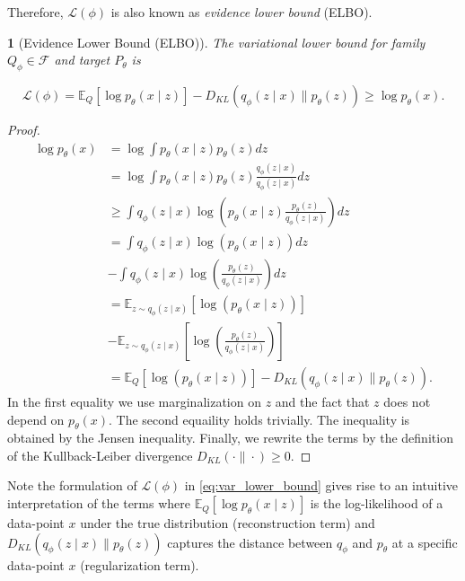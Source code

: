 \documentclass[11pt]{article}
\theoremstyle{plain}
\theoremstyle{definition}
\theoremstyle{plain}
\newtheorem{lem}[thm]{\protect\lemmaname}
\providecommand{\lemmaname}{Lemma}
\begin{document}
\noindent Therefore, $\mathcal{L}(\phi)$ is also known as \textit{evidence
lower bound} (ELBO). 
\begin{lem}[Evidence Lower Bound (ELBO)]
The variational lower bound for family $Q_{\phi}\in\mathcal{F}$
and target $P_{\theta}$ is

\begin{equation}
\mathcal{L}(\phi)=\mathbb{E}_{Q}\left[\log p_{\theta}(x\mid z)\right]-D_{KL}\left(q_{\phi}(z\mid x)\rVert p_{\theta}(z)\right)\geq\log p_{\theta}(x).\label{eq:var_lower_bound}
\end{equation}
\end{lem}
\begin{proof}
\begin{equation}
\begin{aligned}\log p_{\theta}(x) & =\log\int p_{\theta}(x\mid z)p_{\theta}(z)dz\\
 & =\log\int p_{\theta}(x\mid z)p_{\theta}(z)\frac{q_{\phi}(z\mid x)}{q_{\phi}(z\mid x)}dz\\
 & \geq\int q_{\phi}(z\mid x)\log\left(p_{\theta}(x\mid z)\frac{p_{\theta}(z)}{q_{\phi}(z\mid x)}\right)dz\\
 & =\int q_{\phi}(z\mid x)\log\left(p_{\theta}(x\mid z)\right)dz\\
 & -\int q_{\phi}(z\mid x)\log\left(\frac{p_{\theta}(z)}{q_{\phi}(z\mid x)}\right)dz\\
 & =\mathbb{E}_{z\sim q_{\phi}(z\mid x)}\left[\log\left(p_{\theta}(x\mid z)\right)\right]\\
 & -\mathbb{E}_{z\sim q_{\phi}(z\mid x)}\left[\log\left(\frac{p_{\theta}(z)}{q_{\phi}(z\mid x)}\right)\right]\\
 & =\mathbb{E}_{Q}\left[\log\left(p_{\theta}(x\mid z)\right)\right]-D_{KL}\left(q_{\phi}(z\mid x)\lVert p_{\theta}(z)\right).
\end{aligned}
\label{eq:app_proof_elbo}
\end{equation}
In the first equality we use marginalization on $z$ and the fact
that $z$ does not depend on $p_{\theta}(x)$. The second equaility
holds trivially. The inequality is obtained by the Jensen inequality.
Finally, we rewrite the terms by the definition of the Kullback-Leiber
divergence $D_{KL}(\cdot\rVert\cdot)\geq0$.
\end{proof}
\noindent Note the formulation of $\mathcal{L}(\phi)$ in \eqref{eq:var_lower_bound}
gives rise to an intuitive interpretation of the terms where $\mathbb{E}_{Q}\left[\log p_{\theta}(x\mid z)\right]$
is the log-likelihood of a data-point $x$ under the true distribution
(reconstruction term) and $D_{KL}\left(q_{\phi}(z\mid x)\rVert p_{\theta}(z)\right)$
captures the distance between $q_{\phi}$ and $p_{\theta}$ at a specific
data-point $x$ (regularization term).
\end{document}
